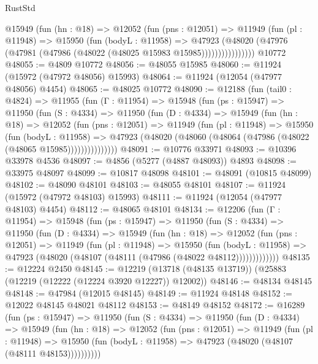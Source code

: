 \begin{lexlean}{RustStd}
\begin{coremodule}
              @15949
                (fun (hn : @18) =>
                @12052
                  (fun (pns : @12051) =>
                  @11949
                    (fun (pl : @11948) =>
                    @15950
                      (fun (bodyL : @11958) =>
                      @47923
                        (@48020
                          (@47976 (@47981 (@47986 (@48022 (@48025 @15983 @15985))))))))))))))))
    @10772
@48055 := @4809 @10772
@48056 := @48055 @15985
@48060 := @11924 (@15972 (@47972 @48056) @15993)
@48064 := @11924 (@12054 (@47977 @48056) @4454)
@48065 := @48025 @10772
@48090 := @12188
    (fun (tail0 : @4824) =>
    @11955
      (fun (Γ : @11954) =>
      @15948
        (fun (ps : @15947) =>
        @11950
          (fun (S : @4334) =>
          @11950
            (fun (D : @4334) =>
            @15949
              (fun (hn : @18) =>
              @12052
                (fun (pns : @12051) =>
                @11949
                  (fun (pl : @11948) =>
                  @15950
                    (fun (bodyL : @11958) =>
                    @47923 (@48020 (@48060 (@48064 (@47986 (@48022 (@48065 @15985)))))))))))))))
@48091 := @10776 @33971
@48093 := @10396 @33978 @4536
@48097 := @4856 (@5277 (@4887 @48093)) @4893
@48098 := @33975 @48097
@48099 := @10817 @48098
@48101 := @48091 (@10815 @48099)
@48102 := @48090 @48101
@48103 := @48055 @48101
@48107 := @11924 (@15972 (@47972 @48103) @15993)
@48111 := @11924 (@12054 (@47977 @48103) @4454)
@48112 := @48065 @48101
@48134 := @12206
    (fun (Γ : @11954) =>
    @15948
      (fun (ps : @15947) =>
      @11950
        (fun (S : @4334) =>
        @11950
          (fun (D : @4334) =>
          @15949
            (fun (hn : @18) =>
            @12052
              (fun (pns : @12051) =>
              @11949
                (fun (pl : @11948) =>
                @15950
                  (fun (bodyL : @11958) =>
                  @47923 (@48020 (@48107 (@48111 (@47986 (@48022 @48112)))))))))))))
@48135 := @12224 @2450
@48145 := @12219 (@13718 (@48135 @13719)) (@25883 (@12219 (@12222 (@12224 @3920 @12227)) @12002))
@48146 := @48134 @48145
@48148 := @47984 (@12015 @48145)
@48149 := @11924 @48148
@48152 := @12022 @48145 @48021 @48112
@48153 := @48149 @48152
@48172 := @16289
    (fun (ps : @15947) =>
    @11950
      (fun (S : @4334) =>
      @11950
        (fun (D : @4334) =>
        @15949
          (fun (hn : @18) =>
          @12052
            (fun (pns : @12051) =>
            @11949
              (fun (pl : @11948) =>
              @15950 (fun (bodyL : @11958) => @47923 (@48020 (@48107 (@48111 @48153))))))))))

\end{coremodule}
\end{lexlean}

